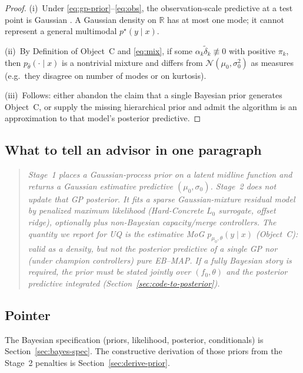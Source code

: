 \documentclass[11pt,a4paper]{article}
\theoremstyle{plain}
\theoremstyle{definition}
\theoremstyle{remark}
\newcommand{\R}{\mathbb{R}}
\newcommand{\Ncal}{\mathcal{N}}
\newcommand{\tht}{\theta}
\newcommand{\EBMAP}{EB--MAP}
\begin{document}
\begin{proof}
(i)~Under \eqref{eq:gp-prior}--\eqref{eq:obs}, the observation-scale predictive at a
test point is Gaussian \citep{RasmussenWilliams2006}. A Gaussian density on \(\R\)
has at most one mode; it cannot represent a general multimodal \(p^\star(y\mid x)\).

(ii)~By Definition of Object~C and \eqref{eq:mix}, if some \(\alpha_k\tilde\delta_k\not\equiv 0\)
with positive \(\pi_k\), then \(p_{\hat\tht}(\cdot\mid x)\) is a nontrivial mixture and
differs from \(\Ncal(\mu_0,\sigma_0^2)\) as measures (e.g.\ they disagree on number of
modes or on kurtosis).

(iii)~Follows: either abandon the claim that a single Bayesian prior generates
Object~C, or supply the missing hierarchical prior and admit the algorithm is an
approximation to that model's posterior predictive.
\end{proof}

\subsection{What to tell an advisor in one paragraph}
\begin{quote}
\emph{Stage~1 places a Gaussian-process prior on a latent midline function and
returns a Gaussian estimative predictive \((\mu_0,\sigma_0)\). Stage~2 does not update
that GP posterior. It fits a sparse Gaussian-mixture residual model by penalized
maximum likelihood (Hard-Concrete \(L_0\) surrogate, offset ridge), optionally plus
non-Bayesian capacity/merge controllers. The quantity we report for UQ is the
estimative MoG \(p_{\mu_0,\hat\tht}(y\mid x)\) (Object~C): valid as a density, but not
the posterior predictive of a single GP nor (under champion controllers) pure
\EBMAP. If a fully Bayesian story is required, the prior must be stated jointly
over \((f_0,\tht)\) and the posterior predictive integrated
(Section~\ref{sec:code-to-posterior}).}
\end{quote}

\subsection{Pointer}
The Bayesian specification (priors, likelihood, posterior, conditionals) is
Section~\ref{sec:bayes-spec}.
The constructive derivation of those priors from the Stage~2 penalties is
Section~\ref{sec:derive-prior}.

\end{document}
